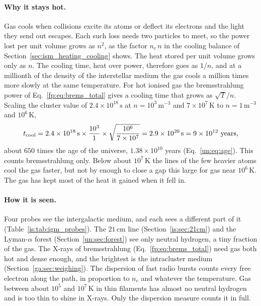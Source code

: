 \paragraph{Why it stays hot.} Gas cools when collisions excite its atoms or deflect its electrons and the light they send out escapes. Each such loss needs two particles to meet, so the power lost per unit volume grows as $n^2$, as the factor $n_c\,n$ in the cooling balance of Section~\ref{sec:ism_heating_cooling} shows. The heat stored per unit volume grows only as $n$. The cooling time, heat over power, therefore goes as $1/n$, and at a millionth of the density of the interstellar medium the gas cools a million times more slowly at the same temperature. For hot ionised gas the bremsstrahlung power of Eq.~\eqref{fp:eq:brems_total} gives a cooling time that grows as $\sqrt T/n$. Scaling the cluster value of $2.4\times10^{18}\,\mathrm s$ at $n=10^3\,\mathrm{m^{-3}}$ and $7\times10^7\,\mathrm K$ to $n=1\,\mathrm{m^{-3}}$ and $10^6\,\mathrm K$,
\[
t_{\rm cool}=2.4\times10^{18}\,\mathrm s\times\frac{10^3}{1}\times\sqrt{\frac{10^6}{7\times10^7}}=2.9\times10^{20}\,\mathrm s=9\times10^{12}\ \text{years},
\]
about $650$ times the age of the universe, $1.38\times10^{10}$ years (Eq.~\eqref{un:eq:age}). This counts bremsstrahlung only. Below about $10^7\,\mathrm K$ the lines of the few heavier atoms cool the gas faster, but not by enough to close a gap this large for gas near $10^6\,\mathrm K$. The gas has kept most of the heat it gained when it fell in.

\paragraph{How it is seen.} Four probes see the intergalactic medium, and each sees a different part of it (Table~\ref{is:tab:igm_probes}). The $21\,\mathrm{cm}$ line (Section~\ref{is:sec:21cm}) and the Lyman-$\alpha$ forest (Section~\ref{un:sec:forest}) see only neutral hydrogen, a tiny fraction of the gas. The X-rays of bremsstrahlung (Eq.~\eqref{fp:eq:brems_total}) need gas both hot and dense enough, and the brightest is the intracluster medium (Section~\ref{ga:sec:weighing}). The dispersion of fast radio bursts counts every free electron along the path, in proportion to $n_e$ and whatever the temperature. Gas between about $10^5$ and $10^7\,\mathrm K$ in thin filaments has almost no neutral hydrogen and is too thin to shine in X-rays. Only the dispersion measure counts it in full.

